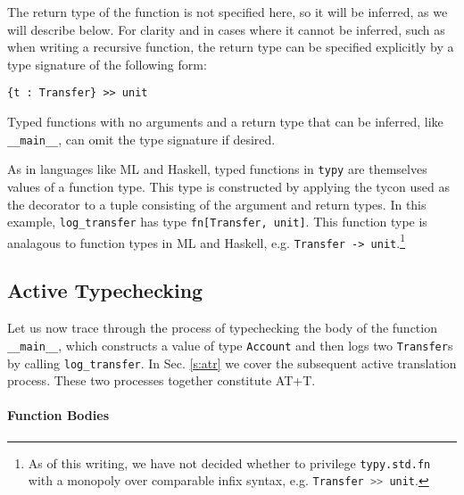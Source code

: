 \documentclass{sigplanconf}
\newcommand{\lip}[1]{\lstinline[language=Python,basicstyle=\ttfamily\small,deletendkeywords={tuple,buffer,map}]{#1}}
\begin{document}
The return type of the function is not specified here, so it will be inferred, as we will describe below. For clarity and in cases where it cannot be inferred, such as when writing a recursive function, the return type can be specified explicitly by a type signature of the following form:
 \begin{lstlisting}[numbers=none]
 {t : Transfer} >> unit
 \end{lstlisting}
Typed functions with no arguments and a return type that can be inferred, like \lip{__main__}, can omit the type signature if desired.

As in languages like ML and Haskell, typed functions in \verb|typy| are themselves values of a function type. This type is constructed by applying the tycon used as the decorator to a tuple consisting of the argument and return types. In this example, \lip{log_transfer} has type \lip{fn[Transfer, unit]}. This function type is analagous to function types in ML and Haskell, e.g. \lstinline{Transfer -> unit}.\footnote{As of this writing, we have not decided whether to privilege \lip{typy.std.fn} with a monopoly over comparable infix syntax, e.g. \lip{Transfer >> unit}.}

\subsection{Active Typechecking}\label{s:atc}
Let us now trace through the process of typechecking the body of the function \lip{__main__}, which constructs a value of type \lip{Account} and then logs two \lip{Transfer}s by calling \lip{log_transfer}. In Sec. \ref{s:atr} we cover the subsequent active translation process. These two processes together constitute AT+T.

\paragraph{Function Bodies}
\end{document}
